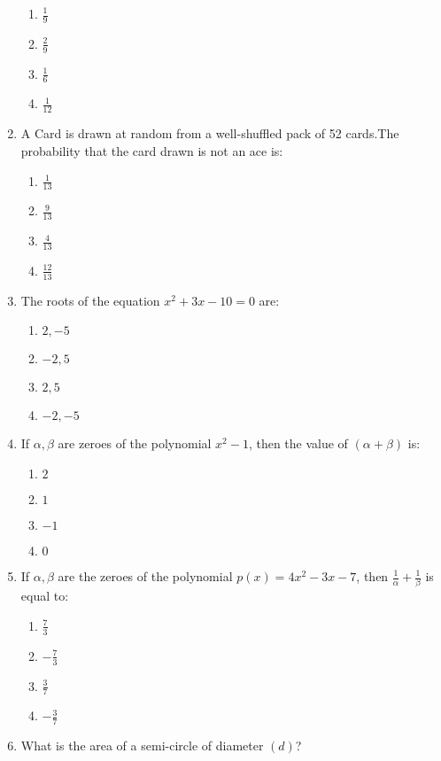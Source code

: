 \documentclass[12pt,-letter paper]{article}
\providecommand{\brak}[1]{\ensuremath{\left(#1\right)}}
\begin{document}
\begin{enumerate}
	\begin{enumerate}
	\item  $\frac{1}{9}$
	\item $\frac{2}{9}$
	\item  $\frac{1}{6}$
	\item  $\frac{1}{12}$
\end{enumerate}
\item A Card is drawn at random from a well-shuffled pack of 52 cards.The probability that the card drawn is not an ace is:
\begin{enumerate}
	\item $\frac{1}{13}$
	\item  $\frac{9}{13}$
	\item $\frac{4}{13}$
	\item $\frac{12}{13}$
\end{enumerate}
\item The roots of the equation $x^2 + 3x - 10 = 0$ are:

\begin{enumerate}
    \item$2, -5$
    \item $-2, 5$
    \item $2, 5$
    \item $-2, -5$
\end{enumerate}

\item If $\alpha, \beta$ are zeroes of the polynomial $x^2 - 1$, then the value of $\brak{\alpha + \beta}$ is:

\begin{enumerate}
    \item $2$
    \item $1$
    \item $-1$
    \item $0$
\end{enumerate}
\newpage
\item If $ \alpha, \beta $ are the zeroes of the polynomial $ p\brak{x} = 4x^2 - 3x - 7 $, then $ \frac{1}{\alpha} + \frac{1}{\beta} $ is equal to:

\begin{enumerate}
    \item $\frac{7}{3}$
    \item$-\frac{7}{3}$
    \item $\frac{3}{7}$
    \item $-\frac{3}{7}$
\end{enumerate}
\item What is the area of a semi-circle of diameter $\brak{d}$?


\end{enumerate}
\end{document}
